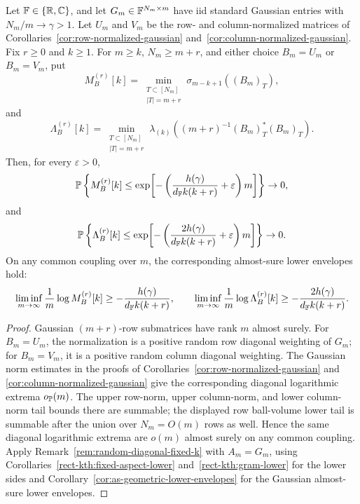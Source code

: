 \begin{corollary}\label{cor:normalized-gaussian-fixed-excess-fixed-k}
Let \(\mathbb{F}\in\{\mathbb{R},\mathbb{C}\}\), and let \(G_m\in\mathbb{F}^{N_m\times m}\) have iid standard
Gaussian entries with \(N_m/m\to\gamma>1\).  Let \(U_m\) and \(V_m\) be the row-
and column-normalized matrices of Corollaries~\ref{cor:row-normalized-gaussian}
and~\ref{cor:column-normalized-gaussian}.  Fix \(r\ge0\) and \(k\ge1\).  For
\(m\ge k\), \(N_m\ge m+r\), and either choice \(B_m=U_m\) or \(B_m=V_m\), put
\[
  M_B^{(r)}[k]
  =
  \min_{\substack{T\subset[N_m]\\ |T|=m+r}}\sigma_{m-k+1}((B_m)_T),
\]
and
\[
  \Lambda_B^{(r)}[k]
  =
  \min_{\substack{T\subset[N_m]\\ |T|=m+r}}
  \lambda_{(k)}\!\left((m+r)^{-1}(B_m)_T^*(B_m)_T\right).
\]
Then, for every \(\varepsilon>0\),
\[
  \mathbb{P}\left\{M_B^{(r)}[k]\le
  \exp\!\left[-\left(\frac{h(\gamma)}{d_{\mathbb{F}} k(k+r)}
    +\varepsilon\right)m\right]\right\}
  \to0,
\]
and
\[
  \mathbb{P}\left\{\Lambda_B^{(r)}[k]\le
  \exp\!\left[-\left(\frac{2h(\gamma)}{d_{\mathbb{F}} k(k+r)}
    +\varepsilon\right)m\right]\right\}
  \to0.
\]
On any common coupling over \(m\), the corresponding almost-sure lower
envelopes hold:
\[
  \liminf_{m\to\infty}\frac1m\log M_B^{(r)}[k]
  \ge -\frac{h(\gamma)}{d_{\mathbb{F}} k(k+r)},
  \qquad
  \liminf_{m\to\infty}\frac1m\log \Lambda_B^{(r)}[k]
  \ge -\frac{2h(\gamma)}{d_{\mathbb{F}} k(k+r)} .
\]
\end{corollary}

\begin{proof}
Gaussian \((m+r)\)-row submatrices have rank \(m\) almost surely.  For
\(B_m=U_m\), the normalization is a positive random row diagonal weighting of
\(G_m\); for \(B_m=V_m\), it is a positive random column diagonal weighting.
The Gaussian norm estimates in the proofs of
Corollaries~\ref{cor:row-normalized-gaussian} and
\ref{cor:column-normalized-gaussian} give the corresponding diagonal logarithmic
extrema \(o_{\mathbb{P}}(m)\).  The upper row-norm, upper column-norm, and lower
column-norm tail bounds there are summable; the displayed row ball-volume lower
tail is summable after the union over \(N_m=O(m)\) rows as well.  Hence the same
diagonal logarithmic extrema are \(o(m)\) almost surely on any common coupling.
Apply Remark~\ref{rem:random-diagonal-fixed-k} with \(A_m=G_m\), using
Corollaries~\ref{rect-kth:fixed-aspect-lower} and~\ref{rect-kth:gram-lower} for
the lower sides and Corollary~\ref{cor:as-geometric-lower-envelopes} for the
Gaussian almost-sure lower envelopes.
\end{proof}

